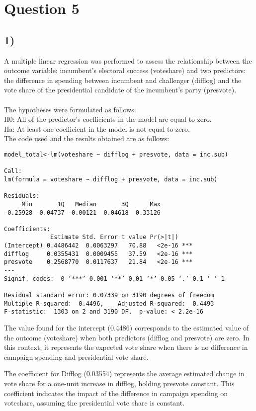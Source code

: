 \documentclass[oneside]{article}
\begin{document}
\section*{Question 5}
\subsection*{1)}
A multiple linear regression was performed to assess the relationship between the outcome variable: incumbent's electoral success (voteshare) and two predictors: the difference in spending between incumbent and challenger (difflog) and the vote share of the presidential candidate of the incumbent's party (presvote).\\
\\
The hypotheses were formulated as follows:
\\
H0: All of the predictor's coefficients in the model are equal to zero.\\
Ha: At least one coefficient in the model is not equal to zero.\\

The code used and the results obtained are as follows:

\begin{verbatim}
model_total<-lm(voteshare ~ difflog + presvote, data = inc.sub)

Call:
lm(formula = voteshare ~ difflog + presvote, data = inc.sub)

Residuals:
     Min       1Q   Median       3Q      Max 
-0.25928 -0.04737 -0.00121  0.04618  0.33126 

Coefficients:
             Estimate Std. Error t value Pr(>|t|)    
(Intercept) 0.4486442  0.0063297   70.88   <2e-16 ***
difflog     0.0355431  0.0009455   37.59   <2e-16 ***
presvote    0.2568770  0.0117637   21.84   <2e-16 ***
---
Signif. codes:  0 ‘***’ 0.001 ‘**’ 0.01 ‘*’ 0.05 ‘.’ 0.1 ‘ ’ 1

Residual standard error: 0.07339 on 3190 degrees of freedom
Multiple R-squared:  0.4496,	Adjusted R-squared:  0.4493 
F-statistic:  1303 on 2 and 3190 DF,  p-value: < 2.2e-16
\end{verbatim}

The value found for the intercept (0.4486) corresponds to the estimated value of the outcome (voteshare) when both predictors (difflog and presvote) are zero. In this context, it represents the expected vote share when there is no difference in campaign spending and presidential vote share.

The coefficient for Difflog (0.03554) represents the average estimated change in vote share for a one-unit increase in difflog, holding presvote constant. This coefficient indicates the impact of the difference in campaign spending on voteshare, assuming the presidential vote share is constant.
\end{document}
